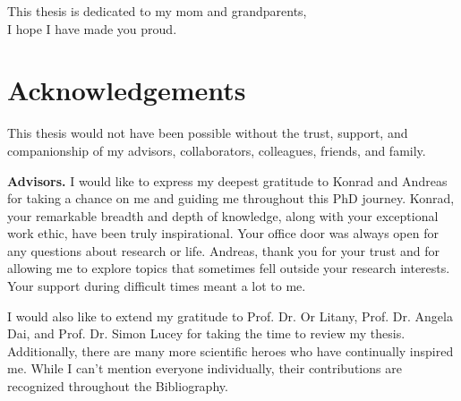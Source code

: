 \newpage
\thispagestyle{empty}
\vspace*{\fill}
\begin{center}
    This thesis is dedicated to my mom and grandparents, \\
    I hope I have made you proud.
\end{center}
\vspace*{\fill}



\chapter*{Acknowledgements}
\label{chap:acknowledgements}

This thesis would not have been possible without the trust, support, and companionship of my advisors, collaborators, colleagues, friends, and family.

\noindent
\textbf{Advisors.}
I would like to express my deepest gratitude to Konrad and Andreas for taking a chance on me and guiding me throughout this PhD journey. Konrad, your remarkable breadth and depth of knowledge, along with your exceptional work ethic, have been truly inspirational. Your office door was always open for any questions about research or life. Andreas, thank you for your trust and for allowing me to explore topics that sometimes fell outside your research interests. Your support during difficult times meant a lot to me.

I would also like to extend my gratitude to Prof. Dr. Or Litany, Prof. Dr. Angela Dai, and Prof. Dr. Simon Lucey for taking the time to review my thesis. Additionally, there are many more scientific heroes who have continually inspired me. While I can't mention everyone individually, their contributions are recognized throughout the Bibliography.

